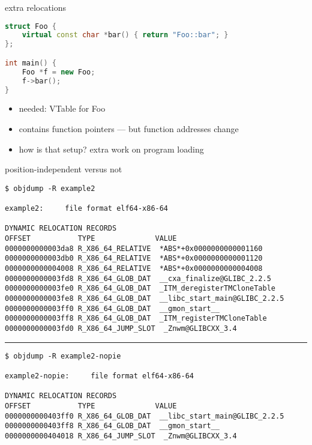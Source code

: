 \begin{frame}[fragile,label=relocVTable]{extra relocations}
\begin{lstlisting}[language=C++,style=smaller]
struct Foo {
    virtual const char *bar() { return "Foo::bar"; }
};

int main() {
    Foo *f = new Foo;
    f->bar();
}
\end{lstlisting}
\begin{itemize}
\item needed: VTable for Foo
\item contains function pointers --- but function addresses change
\item how is that setup? extra work on program loading
\end{itemize}
\end{frame}

\begin{frame}[fragile,label=relocVTable2]{position-independent versus not}
\begin{Verbatim}[fontsize=\fontsize{8}{9}\selectfont]
$ objdump -R example2

example2:     file format elf64-x86-64

DYNAMIC RELOCATION RECORDS
OFFSET           TYPE              VALUE 
0000000000003da8 R_X86_64_RELATIVE  *ABS*+0x0000000000001160
0000000000003db0 R_X86_64_RELATIVE  *ABS*+0x0000000000001120
0000000000004008 R_X86_64_RELATIVE  *ABS*+0x0000000000004008
0000000000003fd8 R_X86_64_GLOB_DAT  __cxa_finalize@GLIBC_2.2.5
0000000000003fe0 R_X86_64_GLOB_DAT  _ITM_deregisterTMCloneTable
0000000000003fe8 R_X86_64_GLOB_DAT  __libc_start_main@GLIBC_2.2.5
0000000000003ff0 R_X86_64_GLOB_DAT  __gmon_start__
0000000000003ff8 R_X86_64_GLOB_DAT  _ITM_registerTMCloneTable
0000000000003fd0 R_X86_64_JUMP_SLOT  _Znwm@GLIBCXX_3.4
\end{Verbatim}
\hrule
\begin{Verbatim}[fontsize=\fontsize{8}{9}\selectfont]
$ objdump -R example2-nopie

example2-nopie:     file format elf64-x86-64

DYNAMIC RELOCATION RECORDS
OFFSET           TYPE              VALUE 
0000000000403ff0 R_X86_64_GLOB_DAT  __libc_start_main@GLIBC_2.2.5
0000000000403ff8 R_X86_64_GLOB_DAT  __gmon_start__
0000000000404018 R_X86_64_JUMP_SLOT  _Znwm@GLIBCXX_3.4
\end{Verbatim}
\end{frame}
